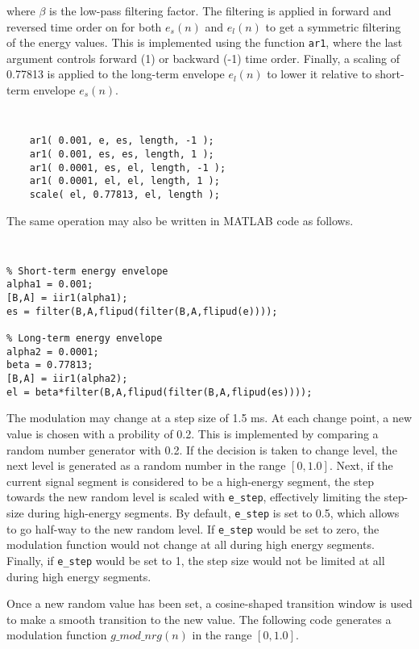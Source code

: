 where $\beta$ is the low-pass filtering factor. The filtering is applied in forward and reversed time order
on for both $e_s(n)$ and $e_l(n)$ to get a symmetric filtering of the energy values. This is implemented using
the function \texttt{ar1}, where the last argument controls forward (1) or backward (-1) time order. Finally,
a scaling of 0.77813 is applied to the long-term envelope $e_l(n)$ to lower it relative to short-term envelope 
$e_s(n)$. 

{\tt\small
\begin{verbatim}
    ar1( 0.001, e, es, length, -1 );
    ar1( 0.001, es, es, length, 1 );
    ar1( 0.0001, es, el, length, -1 );
    ar1( 0.0001, el, el, length, 1 );
    scale( el, 0.77813, el, length );
\end{verbatim}
}

The same operation may also be written in MATLAB code as follows.

{\tt\small
\begin{verbatim}
% Short-term energy envelope
alpha1 = 0.001;
[B,A] = iir1(alpha1);
es = filter(B,A,flipud(filter(B,A,flipud(e))));

% Long-term energy envelope
alpha2 = 0.0001;
beta = 0.77813;
[B,A] = iir1(alpha2);
el = beta*filter(B,A,flipud(filter(B,A,flipud(es))));
\end{verbatim}
}

The modulation may change at a step size of 1.5 ms. At each change point, a new value is chosen
with a probility of 0.2. This is implemented by comparing a random number generator with 0.2. If the decision
is taken to change level, the next level is generated as a random number in the range $[0,1.0]$. Next, if
the current signal segment is considered to be a high-energy segment, the step towards the new random level is
scaled with \texttt{e\_step}, effectively limiting the step-size during high-energy segments. By default, 
\texttt{e\_step} is set to 0.5, which allows to go half-way to the new random level. If \texttt{e\_step} would
be set to zero, the modulation function would not change at all during high energy segments. Finally, if \texttt{e\_step}
would be set to 1, the step size would not be limited at all during high energy segments.

Once a new random value has been set, a cosine-shaped transition window is used to make a smooth transition to the
new value. The following code generates a modulation function $g\_mod\_nrg(n)$ in the range $[0,1.0]$. 

